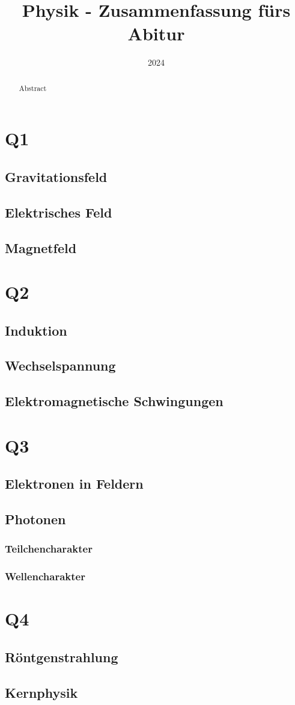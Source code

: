 \documentclass[]{article}
\title{Physik - Zusammenfassung fürs Abitur}
\date{2024}
\begin{document}
	\maketitle
	
	\begin{abstract}
		Abstract
	\end{abstract}
	
	\tableofcontents
	
	\section{Q1}
		\subsection{Gravitationsfeld}
		\subsection{Elektrisches Feld}
		\subsection{Magnetfeld}
		
	
	\section{Q2}
		\subsection{Induktion}
		\subsection{Wechselspannung}
		\subsection{Elektromagnetische Schwingungen}
	
	\section{Q3}
		\subsection{Elektronen in Feldern}
		\subsection{Photonen}
			\subsubsection{Teilchencharakter}
			\subsubsection{Wellencharakter}
	
	\section{Q4}
		\subsection{Röntgenstrahlung}
		\subsection{Kernphysik}
	
\end{document}
